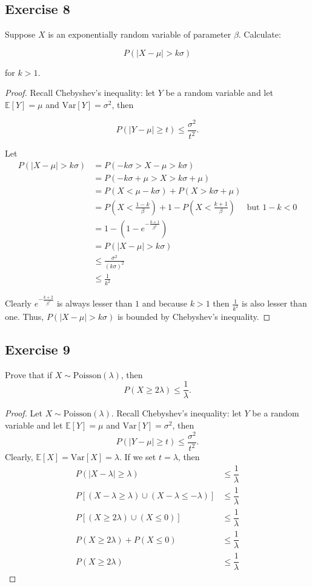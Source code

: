\documentclass[11pt]{article}
\theoremstyle{definition}
\theoremstyle{remark}
\theoremstyle{remark}
\newcommand{\E}[1]{\mathbb{E}\left[#1 \right]}
\newcommand{\V}[1]{\mathrm{Var}\left[#1 \right]}
\begin{document}
\subsection*{Exercise 8}
Suppose $X$ is an exponentially random variable of parameter
$\beta$. Calculate:

$$P(|X-\mu|>k \sigma)$$

for $k>1$.

\begin{proof}
  Recall Chebyshev's inequality: let $Y$ be a random variable and let
  $\E{Y}=\mu$ and $\V{Y}=\sigma^2$, then

\[
  P(|Y-\mu|\geq t)\leq\dfrac{\sigma^2}{t^2}.
\]

Let
\begin{align*}
  P(|X-\mu|>k \sigma) &=P(-k \sigma>X-\mu>k \sigma) \\
                      &=P(-k \sigma+\mu>X>k \sigma+\mu) \\
                      &=P(X<\mu-k \sigma)+P(X>k \sigma+\mu) \\
                      &=P\left(X<\frac{1-k}{\beta}\right)+1-P\left(X<\frac{k+1}{\beta}\right) \quad \text { but } 1-k<0\\
                      &=1-\left(1-e^{-\frac{k+1}{\beta^{2}}}\right) \\
                      &=P(|X-\mu|>k \sigma)\\
                      &\leq \frac{\sigma^{2}}{(k \sigma)^{2}} \\
                      &\leq \frac{1}{k^{2}}
\end{align*}

Clearly $e^{-\frac{k+2}{\beta^{2}}}$ is always lesser than $1$ and
because $k>1$ then $\frac{1}{k^{2}}$ is also lesser than one. Thus,
$P(|X-\mu|>k \sigma)$ is bounded by Chebyshev's inequality.
\end{proof}


\subsection*{Exercise 9}
Prove that if $X\sim \mathrm{Poisson}(\lambda)$, then
\[
  P(X\geq 2\lambda)\leq \dfrac{1}{\lambda}.
\]
\begin{proof}
  Let $X\sim \mathrm{Poisson}(\lambda)$. Recall Chebyshev's
  inequality: let $Y$ be a random variable and let $\E{Y}=\mu$ and
  $\V{Y}=\sigma^2$, then
\[
  P(|Y-\mu|\geq t)\leq\dfrac{\sigma^2}{t^2}.
\]
Clearly, $\E{X}=\V{X}=\lambda$. If we set $t=\lambda$, then
\[
\begin{split}
  P(|X-\lambda|\geq\lambda)&\leq\dfrac{1}{\lambda}\\
  P\left[(X-\lambda\geq\lambda)\cup(X-\lambda\leq-\lambda)\right]&\leq\dfrac{1}{\lambda}\\
  P\left[(X\geq2\lambda)\cup(X\leq0)\right]&\leq\dfrac{1}{\lambda}\\
  P(X\geq2\lambda)+P(X\leq0)&\leq\dfrac{1}{\lambda}\\
  P(X\geq 2\lambda)&\leq \dfrac{1}{\lambda}
\end{split}
\]
\end{proof}
\end{document}
